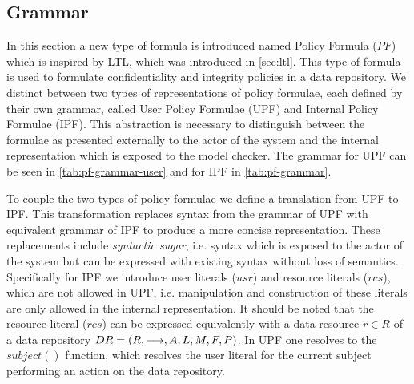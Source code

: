 \subsection{Grammar}\label{sec:grammar}
In this section a new type of formula is introduced named Policy Formula ($PF$) which is inspired by LTL, which was introduced in \autoref{sec:ltl}. This type of formula is used to formulate confidentiality and integrity policies in a data repository. We distinct between two types of representations of policy formulae, each defined by their own grammar, called User Policy Formulae (UPF) and Internal Policy Formulae (IPF). This abstraction is necessary to distinguish between the formulae as presented externally to the actor of the system and the internal representation which is exposed to the model checker. The grammar for UPF can be seen in \autoref{tab:pf-grammar-user} and for IPF in \autoref{tab:pf-grammar}.





To couple the two types of policy formulae we define a translation from UPF to IPF. This transformation replaces syntax from the grammar of UPF with equivalent grammar of IPF to produce a more concise representation. These replacements include \emph{syntactic sugar}, i.e. syntax which is exposed to the actor of the system but can be expressed with existing syntax without loss of semantics. Specifically for IPF we introduce user literals ($usr$) and resource literals ($rcs$), which are not allowed in UPF, i.e. manipulation and construction of these literals are only allowed in the internal representation. It should be noted that the resource literal ($rcs$) can be expressed equivalently with a data resource $r \in R$ of a data repository $DR= \left( R, \longrightarrow, A, L, M, F, P \right)$. In UPF one resolves to the $subject()$ function, which resolves the user literal for the current subject performing an action on the data repository.

